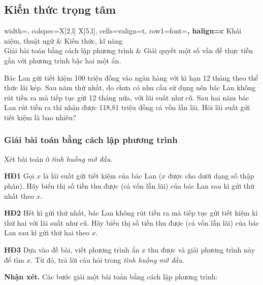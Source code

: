 \begin{lesson}
    \subsection{Kiến thức trọng tâm}

    \begin{center}
    \begin{tblr}{
        width=\linewidth,
        colspec={X[2,l] X[5,l]},
        cells={valign=t},
        row{1}={font=\bfseries, halign=c}
    }
        Khái niệm, thuật ngữ & Kiến thức, kĩ năng \\
        Giải bài toán bằng cách lập phương trình & Giải quyết một số vấn đề thực tiễn gắn với phương trình bậc hai một ẩn.
    \end{tblr}
    \end{center}

    Bác Lan gửi tiết kiệm 100 triệu đồng vào ngân hàng với kì hạn 12 tháng theo thể thức lãi kép. Sau năm thứ nhất, do chưa có nhu cầu sử dụng nên bác Lan không rút tiền ra mà tiếp tục gửi 12 tháng nữa, với lãi suất như cũ. Sau hai năm bác Lan rút tiền ra thì nhận được 118,81 triệu đồng cả vốn lẫn lãi. Hỏi lãi suất gửi tiết kiệm là bao nhiêu?

    \subsubsection{Giải bài toán bằng cách lập phương trình}

    Xét bài toán ở \textit{tình huống mở đầu}.

    \textbf{HĐ1} Gọi $x$ là lãi suất gửi tiết kiệm của bác Lan ($x$ được cho dưới dạng số thập phân). Hãy biểu thị số tiền thu được (cả vốn lẫn lãi) của bác Lan sau kì gửi thứ nhất theo $x$.

    \answerline
    \answerline

    \textbf{HĐ2} Hết kì gửi thứ nhất, bác Lan không rút tiền ra mà tiếp tục gửi tiết kiệm kì thứ hai với lãi suất như cũ. Hãy biểu thị số tiền thu được (cả vốn lẫn lãi) của bác Lan sau kì gửi thứ hai theo $x$.

    \answerline
    \answerline

    \textbf{HĐ3} Dựa vào đề bài, viết phương trình ẩn $x$ thu được và giải phương trình này để tìm $x$. Từ đó, trả lời câu hỏi trong \textit{tình huống mở đầu}.

    \answerline
    \answerline
    \answerline

    \textbf{Nhận xét.} Các bước giải một bài toán bằng cách lập phương trình:


\end{lesson}
